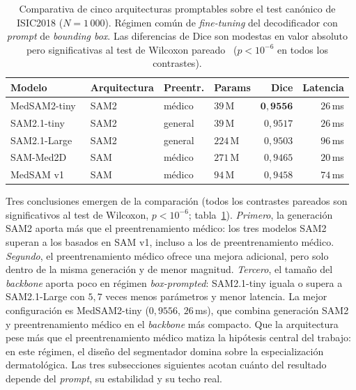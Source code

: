 \begin{table}[H]
\centering
\footnotesize
\setlength{\tabcolsep}{4pt}
\renewcommand{\arraystretch}{0.95}
\caption{Comparativa de cinco arquitecturas promptables sobre el
test canónico de ISIC2018 ($N = 1\,000$). Régimen común de
\emph{fine-tuning} del decodificador con \emph{prompt} de
\emph{bounding box}. Las diferencias de Dice son modestas en valor
absoluto pero significativas al test de Wilcoxon
pareado~\cite{wilcoxon1945}
($p < 10^{-6}$ en todos los contrastes).}
\label{tab:seg-arquitecturas}
\begin{tabular}{llllrr}
\hline
Modelo            & Arquitectura       & Preentr. & Params & Dice & Latencia \\
\hline
MedSAM2-tiny~\cite{medsam2} & SAM2~\cite{sam2}   & médico   & $39$\,M  & $\mathbf{0{,}9556}$ & $26$\,ms \\
SAM2.1-tiny       & SAM2~\cite{sam2}   & general  & $39$\,M  & $0{,}9517$ & $26$\,ms \\
SAM2.1-Large      & SAM2~\cite{sam2}   & general  & $224$\,M & $0{,}9503$ & $96$\,ms \\
SAM-Med2D~\cite{sammed2d} & SAM~\cite{sam2023} & médico   & $271$\,M & $0{,}9465$ & $20$\,ms \\
MedSAM v1~\cite{medsam}   & SAM~\cite{sam2023} & médico   & $94$\,M  & $0{,}9458$ & $74$\,ms \\
\hline
\end{tabular}
\end{table}

Tres conclusiones emergen de la comparación (todos los contrastes
pareados son significativos al test de Wilcoxon, $p < 10^{-6}$;
tabla~\ref{tab:seg-arquitecturas}). \textit{Primero}, la generación
SAM2 aporta más que el preentrenamiento médico: los tres modelos SAM2
superan a los basados en SAM v1, incluso a los de preentrenamiento
médico. \textit{Segundo}, el preentrenamiento médico ofrece una mejora
adicional, pero solo dentro de la misma generación y de menor
magnitud. \textit{Tercero}, el tamaño del \emph{backbone} aporta poco
en régimen \emph{box-prompted}: SAM2.1-tiny iguala o supera a
SAM2.1-Large con $5{,}7$ veces menos parámetros y menor latencia. La
mejor configuración es MedSAM2-tiny ($0{,}9556$, $26$\,ms), que
combina generación SAM2 y preentrenamiento médico en el
\emph{backbone} más compacto. Que la arquitectura pese más que el
preentrenamiento médico matiza la hipótesis central del trabajo: en
este régimen, el diseño del segmentador domina sobre la
especialización dermatológica. Las tres subsecciones siguientes acotan
cuánto del resultado depende del \emph{prompt}, su estabilidad y su
techo real.

